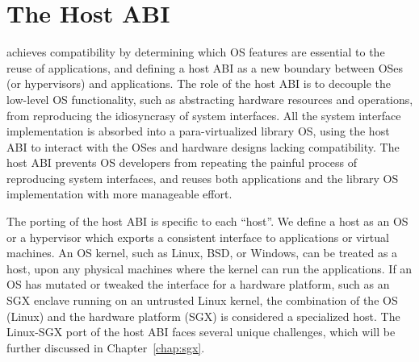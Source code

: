 \section{The Host ABI}
\label{sec:overview:host}


\graphene{} achieves compatibility by determining which OS features
are essential to the reuse of applications, and defining a host ABI as a new boundary between OSes (or hypervisors) and applications.
The role of the host ABI is to decouple the low-level OS functionality, such as abstracting hardware resources and operations, from reproducing the idiosyncrasy of system interfaces. 
All the system interface implementation is absorbed
into a para-virtualized library OS,
using the host ABI to interact with the OSes and hardware designs
lacking compatibility.
The host ABI prevents OS developers
from repeating the painful process of reproducing system interfaces,
and reuses both applications and the library OS implementation with more manageable effort.


 






The porting of the host ABI is specific to each ``host''. We define a host as an OS or a hypervisor which exports a consistent interface to applications or virtual machines.
An OS kernel, such as Linux, BSD, or Windows, can be treated as a host, upon any physical machines where the kernel can run the applications.
If an OS has mutated or tweaked the interface for a hardware platform,
such as an SGX enclave 
running on an untrusted Linux kernel,
the combination of the OS (Linux) and the hardware platform (SGX) is considered a specialized host.
The Linux-SGX port of the host ABI faces several unique challenges,
which will be further discussed in Chapter~\ref{chap:sgx}.



